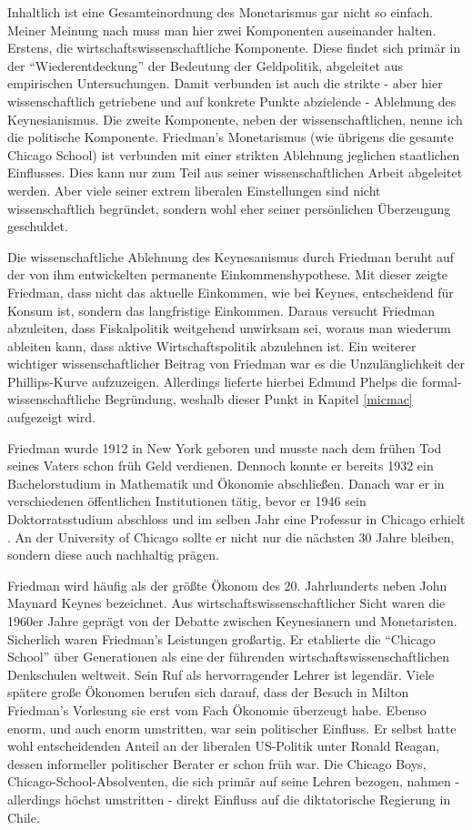 Inhaltlich ist eine Gesamteinordnung des Monetarismus gar nicht so einfach. Meiner Meinung nach muss man hier zwei Komponenten auseinander halten. Erstens, die wirtschaftswissenschaftliche Komponente. Diese findet sich primär in der "`Wiederentdeckung"' der Bedeutung der Geldpolitik, abgeleitet aus empirischen Untersuchungen. Damit verbunden ist auch die strikte - aber hier wissenschaftlich getriebene und auf konkrete Punkte abzielende - Ablehnung des Keynesianismus. 
Die zweite Komponente, neben der wissenschaftlichen, nenne ich die politische Komponente. Friedman's Monetarismus (wie übrigens die gesamte Chicago School) ist verbunden mit einer strikten Ablehnung jeglichen staatlichen Einflusses. Dies kann nur zum Teil aus seiner wissenschaftlichen Arbeit abgeleitet werden. Aber viele seiner extrem liberalen Einstellungen sind nicht wissenschaftlich begründet, sondern wohl eher seiner persönlichen Überzeugung geschuldet. 

Die wissenschaftliche Ablehnung des Keynesanismus durch Friedman beruht auf der von ihm entwickelten permanente Einkommenshypothese. Mit dieser zeigte Friedman, dass nicht das aktuelle Einkommen, wie bei Keynes, entscheidend für Konsum ist, sondern das langfristige Einkommen. Daraus versucht Friedman abzuleiten, dass Fiskalpolitik weitgehend unwirksam sei, woraus man wiederum ableiten kann, dass aktive Wirtschaftspolitik abzulehnen ist. Ein weiterer wichtiger wissenschaftlicher Beitrag von Friedman war es die Unzulänglichkeit der Phillips-Kurve aufzuzeigen. Allerdings lieferte hierbei Edmund Phelps die formal-wissenschaftliche Begründung, weshalb dieser Punkt in Kapitel \ref{micmac} aufgezeigt wird.

Friedman wurde 1912 in New York geboren und musste nach dem frühen Tod seines Vaters schon früh Geld verdienen. Dennoch konnte er bereits 1932 ein Bachelorstudium in Mathematik und Ökonomie abschließen. Danach war er in verschiedenen öffentlichen Institutionen tätig, bevor er 1946 sein Doktorratsstudium abschloss und im selben Jahr eine Professur in Chicago erhielt \parencite[S. 204]{Linss2017}. An der University of Chicago sollte er nicht nur die nächsten 30 Jahre bleiben, sondern diese auch nachhaltig prägen.

Friedman wird häufig als der größte Ökonom des 20. Jahrhunderts neben John Maynard Keynes bezeichnet. Aus wirtschaftswissenschaftlicher Sicht waren die 1960er Jahre geprägt von der Debatte zwischen Keynesianern und Monetaristen. Sicherlich waren Friedman's Leistungen großartig. Er etablierte die "`Chicago School"' über Generationen als eine der führenden wirtschaftswissenschaftlichen Denkschulen weltweit. Sein Ruf als hervorragender Lehrer ist legendär. Viele spätere große Ökonomen berufen sich darauf, dass der Besuch in Milton Friedman's Vorlesung sie erst vom Fach Ökonomie überzeugt habe. Ebenso enorm, und auch enorm umstritten, war sein politischer Einfluss. Er selbst hatte wohl entscheidenden Anteil an der liberalen US-Politik unter Ronald Reagan, dessen informeller politischer Berater er schon früh war. Die Chicago Boys, Chicago-School-Absolventen, die sich primär auf seine Lehren bezogen, nahmen - allerdings höchst umstritten - direkt Einfluss auf die diktatorische Regierung in Chile.

